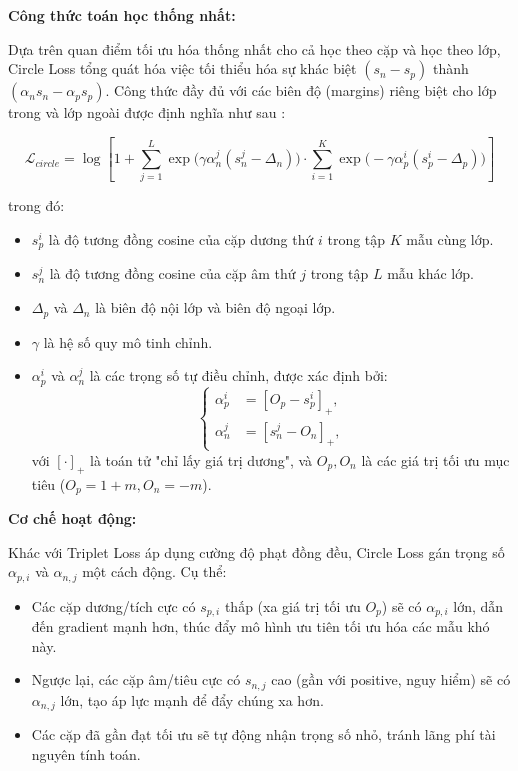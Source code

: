 \textbf{Công thức toán học thống nhất:}

Dựa trên quan điểm tối ưu hóa thống nhất cho cả học theo cặp và học theo lớp, Circle Loss tổng quát hóa việc tối thiểu hóa sự khác biệt $(s_n - s_p)$ thành $(\alpha_n s_n - \alpha_p s_p)$. Công thức đầy đủ với các biên độ (margins) riêng biệt cho lớp trong và lớp ngoài được định nghĩa như sau \cite{circle}:

\begin{equation}
  \mathcal{L}_{circle} = \log\left[ 1 + \sum_{j=1}^{L} \exp\big(\gamma \alpha_n^j (s_n^j - \Delta_n)\big) \cdot \sum_{i=1}^{K} \exp\big(-\gamma \alpha_p^i (s_p^i - \Delta_p)\big) \right]
  \label{eq:circle_loss_full}
\end{equation}

\noindent trong đó:
\begin{itemize}
  \item $s_p^i$ là độ tương đồng cosine của cặp dương thứ $i$ trong tập $K$ mẫu cùng lớp.
  \item $s_n^j$ là độ tương đồng cosine của cặp âm thứ $j$ trong tập $L$ mẫu khác lớp.
  \item $\Delta_p$ và $\Delta_n$ là biên độ nội lớp và biên độ ngoại lớp.
  \item $\gamma$ là hệ số quy mô tinh chỉnh.
  \item $\alpha_p^i$ và $\alpha_n^j$ là các trọng số tự điều chỉnh, được xác định bởi:
        \begin{equation}
          \left\{
          \begin{aligned}
            \alpha_p^i & = [O_p - s_p^i]_+, \\
            \alpha_n^j & = [s_n^j - O_n]_+,
          \end{aligned}
          \right.
        \end{equation}
        với $[ \cdot ]_+$ là toán tử "chỉ lấy giá trị dương", và $O_p, O_n$ là các giá trị tối ưu mục tiêu ($O_p = 1+m, O_n = -m$).
\end{itemize}

\textbf{Cơ chế hoạt động:}

Khác với Triplet Loss áp dụng cường độ phạt đồng đều, Circle Loss gán trọng số $\alpha_{p,i}$ và $\alpha_{n,j}$ một cách động. Cụ thể:
\begin{itemize}
  \item Các cặp dương/tích cực có $s_{p,i}$ thấp (xa giá trị tối ưu $O_p$) sẽ có $\alpha_{p,i}$ lớn, dẫn đến gradient mạnh hơn, thúc đẩy mô hình ưu tiên tối ưu hóa các mẫu khó này.
  \item Ngược lại, các cặp âm/tiêu cực có $s_{n,j}$ cao (gần với positive, nguy hiểm) sẽ có $\alpha_{n,j}$ lớn, tạo áp lực mạnh để đẩy chúng xa hơn.
  \item Các cặp đã gần đạt tối ưu sẽ tự động nhận trọng số nhỏ, tránh lãng phí tài nguyên tính toán.
\end{itemize}


